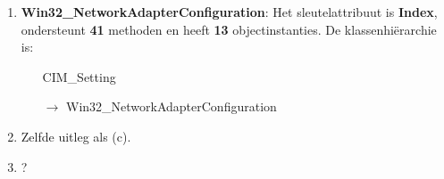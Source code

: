 \documentclass{report}
\begin{document}
\begin{enumerate}
\begin{enumerate}
\begin{itemize}
					\end{itemize} 
					
					\item \textbf{Win32\_NetworkAdapterConfiguration}: Het sleutelattribuut is \textbf{Index}, ondersteunt \textbf{41} methoden en heeft \textbf{13} objectinstanties. De klassenhiërarchie is:
					\begin{itemize}
						\item[] CIM\_Setting
						\item[$\rightarrow$] Win32\_NetworkAdapterConfiguration
					\end{itemize} 
				
					\item Zelfde uitleg als (c).
					
					\item ?
				\end{enumerate}

	\end{enumerate}
\end{document}
